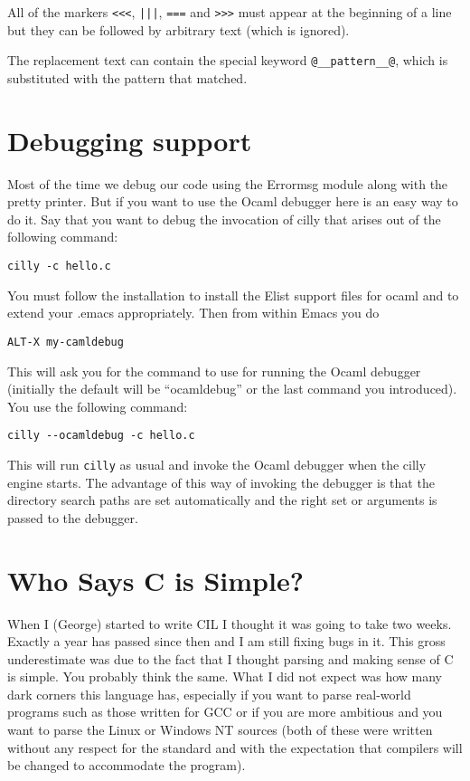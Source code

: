 \documentclass[letterpaper]{article}
\def\t#1{{\tt #1}}
\begin{document}
 All of the markers \t{<<<}, \t{|||}, \t{===} and \t{>>>} must appear at the
beginning of a line but they can be followed by arbitrary text (which is
ignored).

 The replacement text can contain the special keyword \t{@\_\_pattern\_\_@},
which is substituted with the pattern that matched. 


\section{Debugging support}\label{sec-debugger}

 Most of the time we debug our code using the Errormsg module along with the
pretty printer. But if you want to use the Ocaml debugger here is an easy way
to do it. Say that you want to debug the invocation of cilly that arises out
of the following command:
\begin{verbatim}
cilly -c hello.c 
\end{verbatim}

 You must follow the installation 
to install the Elist support files for ocaml and to extend your .emacs
appropriately. Then from within Emacs you do
\begin{verbatim}
ALT-X my-camldebug
\end{verbatim}

 This will ask you for the command to use for running the Ocaml debugger
(initially the default will be ``ocamldebug'' or the last command you
introduced). You use the following command:
\begin{verbatim}
cilly --ocamldebug -c hello.c 
\end{verbatim}

 This will run \t{cilly} as usual and invoke the Ocaml debugger when the cilly
engine starts. The advantage of this way of invoking the debugger is that the
directory search paths are set automatically and the right set or arguments is
passed to the debugger. 


\section{Who Says C is Simple?}\label{sec-simplec}

 When I (George) started to write CIL I thought it was going to take two weeks.
Exactly a year has passed since then and I am still fixing bugs in it. This
gross underestimate was due to the fact that I thought parsing and making
sense of C is simple. You probably think the same. What I did not expect was
how many dark corners this language has, especially if you want to parse
real-world programs such as those written for GCC or if you are more ambitious
and you want to parse the Linux or Windows NT sources (both of these were
written without any respect for the standard and with the expectation that
compilers will be changed to accommodate the program). 
\end{document}
